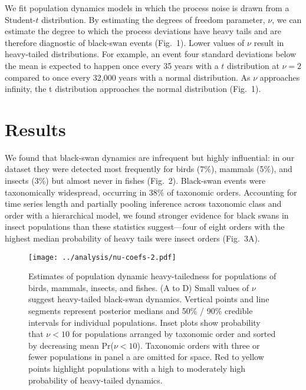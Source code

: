 \documentclass[9pt,twocolumn,twoside]{pnas-new}
\begin{document}
We fit population dynamics models in which the process noise is
drawn from a Student-$t$ distribution. By estimating the degrees of freedom
parameter, \(\nu\), we can estimate the degree to which the process deviations
have heavy tails and are therefore diagnostic of black-swan events (Fig.~1).
Lower values of \(\nu\) result in heavy-tailed distributions.
For example, an event four standard deviations below the mean
is expected to happen once every 35 years with a $t$ distribution at \(\nu = 2\)
compared to once every 32,000 years with a normal distribution.
As \(\nu\) approaches infinity, the t
distribution approaches the normal distribution (Fig.~1).

\section*{Results}

We found that black-swan dynamics are infrequent but highly
influential: in our dataset they were detected most
frequently for birds (7\%), mammals (5\%), and
insects (3\%) but almost never in fishes (Fig.~2). Black-swan
events were taxonomically widespread, occurring in 38\% of taxonomic orders.
Accounting for time series length and partially pooling inference across
taxonomic class and order with a hierarchical model, we found stronger evidence
for black swans in insect populations than these statistics suggest---four of
eight orders with the highest median probability of heavy tails were insect
orders (Fig.~3A).

\begin{figure}[htb]
\centering
\texttt{[image: ../analysis/nu-coefs-2.pdf]}
\caption{Estimates of population dynamic heavy-tailedness for
populations of birds, mammals, insects, and fishes. (A to D)
Small values of \(\nu\) suggest heavy-tailed black-swan dynamics. Vertical
points and line segments represent posterior medians and 50\% / 90\% credible
intervals for individual populations. Inset plots show probability that \(\nu
< 10\) for populations arranged by taxonomic order and sorted by decreasing
mean Pr(\(\nu < 10\)). Taxonomic orders with three or fewer populations in
panel a are omitted for space. Red to yellow points highlight populations
with a high to moderately high probability of heavy-tailed dynamics.
}
\label{fig:2}
\end{figure}
\end{document}
